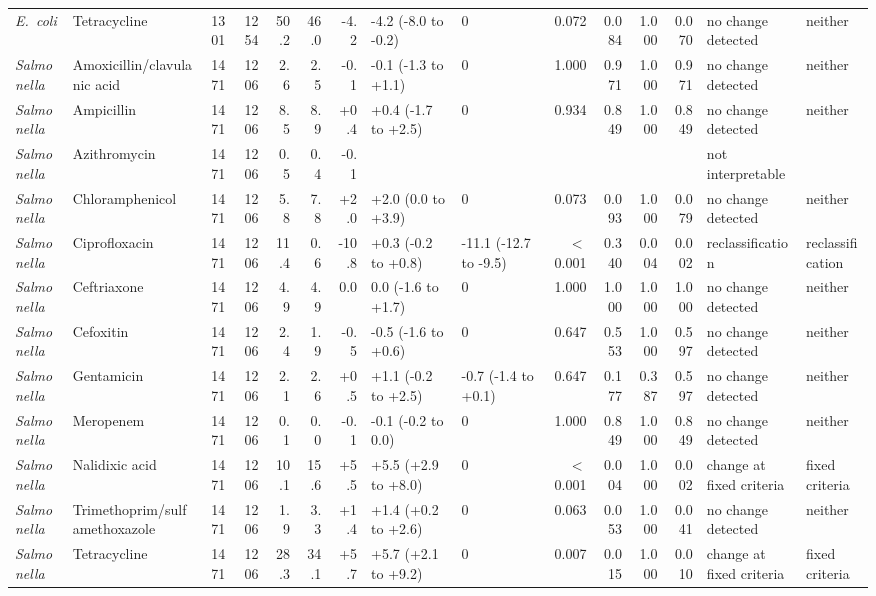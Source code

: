 \begin{table}[h]
\begin{tabular}{llrrrrrllrrrrll}
\textit{E.~coli} & Tetracycline & 1301 & 1254 & 50.2 & 46.0 & -4.2 & -4.2 (-8.0 to -0.2) & 0 & 0.072 & 0.084 & 1.000 & 0.070 & no change detected & neither \\
\textit{Salmonella} & Amoxicillin/clavulanic acid & 1471 & 1206 & 2.6 & 2.5 & -0.1 & -0.1 (-1.3 to +1.1) & 0 & 1.000 & 0.971 & 1.000 & 0.971 & no change detected & neither \\
\textit{Salmonella} & Ampicillin & 1471 & 1206 & 8.5 & 8.9 & +0.4 & +0.4 (-1.7 to +2.5) & 0 & 0.934 & 0.849 & 1.000 & 0.849 & no change detected & neither \\
\textit{Salmonella} & Azithromycin & 1471 & 1206 & 0.5 & 0.4 & -0.1 &  &  &  &  &  &  & not interpretable &  \\
\textit{Salmonella} & Chloramphenicol & 1471 & 1206 & 5.8 & 7.8 & +2.0 & +2.0 (0.0 to +3.9) & 0 & 0.073 & 0.093 & 1.000 & 0.079 & no change detected & neither \\
\textit{Salmonella} & Ciprofloxacin & 1471 & 1206 & 11.4 & 0.6 & -10.8 & +0.3 (-0.2 to +0.8) & -11.1 (-12.7 to -9.5) & $<$0.001 & 0.340 & 0.004 & 0.002 & reclassification & reclassification \\
\textit{Salmonella} & Ceftriaxone & 1471 & 1206 & 4.9 & 4.9 & 0.0 & 0.0 (-1.6 to +1.7) & 0 & 1.000 & 1.000 & 1.000 & 1.000 & no change detected & neither \\
\textit{Salmonella} & Cefoxitin & 1471 & 1206 & 2.4 & 1.9 & -0.5 & -0.5 (-1.6 to +0.6) & 0 & 0.647 & 0.553 & 1.000 & 0.597 & no change detected & neither \\
\textit{Salmonella} & Gentamicin & 1471 & 1206 & 2.1 & 2.6 & +0.5 & +1.1 (-0.2 to +2.5) & -0.7 (-1.4 to +0.1) & 0.647 & 0.177 & 0.387 & 0.597 & no change detected & neither \\
\textit{Salmonella} & Meropenem & 1471 & 1206 & 0.1 & 0.0 & -0.1 & -0.1 (-0.2 to 0.0) & 0 & 1.000 & 0.849 & 1.000 & 0.849 & no change detected & neither \\
\textit{Salmonella} & Nalidixic acid & 1471 & 1206 & 10.1 & 15.6 & +5.5 & +5.5 (+2.9 to +8.0) & 0 & $<$0.001 & 0.004 & 1.000 & 0.002 & change at fixed criteria & fixed criteria \\
\textit{Salmonella} & Trimethoprim/sulfamethoxazole & 1471 & 1206 & 1.9 & 3.3 & +1.4 & +1.4 (+0.2 to +2.6) & 0 & 0.063 & 0.053 & 1.000 & 0.041 & no change detected & neither \\
\textit{Salmonella} & Tetracycline & 1471 & 1206 & 28.3 & 34.1 & +5.7 & +5.7 (+2.1 to +9.2) & 0 & 0.007 & 0.015 & 1.000 & 0.010 & change at fixed criteria & fixed criteria \\

\end{tabular}
\end{table}
